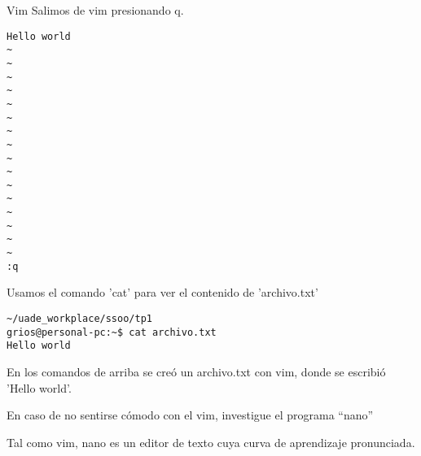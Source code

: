 \begin{section}{Vim}
Salimos de vim presionando q.
\begin{lstlisting}[style=Ubuntu]
Hello world
~                                                                
~                                                                
~                                                                
~                                                                
~                                                                
~                                                                
~                                                                
~                                                                
~                                                                
~                                                                
~                                                                
~                                                                
~                                                                
~                                                                
~                                                                
~                                                                
:q
\end{lstlisting}

Usamos el comando 'cat' para ver el contenido de 'archivo.txt'
\begin{lstlisting}[style=Ubuntu]
~/uade_workplace/ssoo/tp1
grios@personal-pc:~$ cat archivo.txt 
Hello world

\end{lstlisting}

En los comandos de arriba se creó un archivo.txt con vim, donde se escribió 'Hello world'. \\

\begin{quoting}
En caso de no sentirse cómodo con el vim, investigue el programa “nano”
\end{quoting}

Tal como vim, nano es un editor de texto cuya curva de aprendizaje pronunciada.

\end{section}